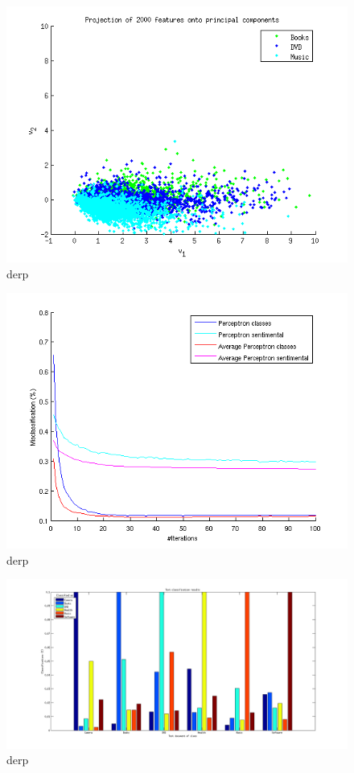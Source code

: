 \begin{figure}[H]
\centering
\includegraphics[scale = 0.5]{../Plottar/pca_somecorr.png}
\caption{derp}
\label{fig:trainingsize}
\end{figure} 

\begin{figure}[H]
\centering
\includegraphics[scale = 0.5]{../Plottar/perceptron_2000words_unigram_10foldcv_classes-high_sentimental-low.png}
\caption{derp}
\label{fig:trainingsize}
\end{figure} 

\begin{figure}[H]
\centering
\includegraphics[scale = 0.5]{../Plottar/text_categorization.png}
\caption{derp}
\label{fig:trainingsize}
\end{figure} 


